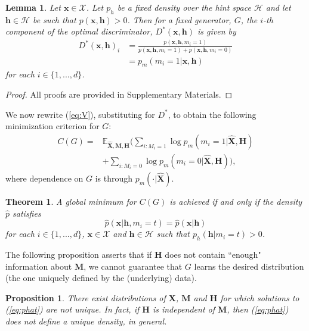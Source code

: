 \documentclass{article}
\newtheorem{theorem}{Theorem}
\newtheorem{proposition}{Proposition}
\newtheorem{lemma}{Lemma}
\begin{document}
\begin{lemma} \label{lem:D}
	Let $\mathbf{x} \in \mathcal{X}$. Let $p_h$ be a fixed density over the hint space $\mathcal{H}$ and let $\mathbf{h} \in \mathcal{H}$ be such that $p(\mathbf{x}, \mathbf{h}) > 0$.	Then for a fixed generator, $G$, the $i$-th component of the optimal discriminator, $D^*(\mathbf{x}, \mathbf{h})$ is given by
	\begin{align} \label{eq:optdis}
	D^*(\mathbf{x}, \mathbf{h})_i &= \frac{p(\mathbf{x}, \mathbf{h}, m_i = 1)}{p(\mathbf{x}, \mathbf{h}, m_i = 1) + p(\mathbf{x}, \mathbf{h}, m_i = 0)} \\
	&= p_m(m_i = 1 | \mathbf{x}, \mathbf{h})
	\end{align}
	for each $i \in \{1, ..., d\}$.
\end{lemma}
\begin{proof}
	All proofs are provided in Supplementary Materials.
\end{proof}

We now rewrite (\ref{eq:V}), substituting for $D^*$, to obtain the following minimization criterion for $G$:
\begin{align}
C(G) = &\mathbb{E}_{\hat{\mathbf{X}}, \mathbf{M}, \mathbf{H}}\Big(\underset{i: M_i = 1}{\sum}\log p_m(m_i = 1 | \hat{\mathbf{X}}, \mathbf{H})\\\nonumber
&+ \underset{i: M_i = 0}{\sum} \log p_m(m_i = 0 | \hat{\mathbf{X}}, \mathbf{H})\Big),
\end{align}
where dependence on $G$ is through $p_m(\cdot | \hat{\mathbf{X}})$.

\begin{theorem} \label{thm:main}
 	A global minimum for $C(G)$ is achieved if and only if the density $\hat{p}$ satisfies
	\begin{equation} \label{eq:phat}
	\hat{p}(\mathbf{x} | \mathbf{h}, m_i = t) = \hat{p}(\mathbf{x} | \mathbf{h})
	\end{equation}
	for each $i \in \{1, ..., d\}$, $\mathbf{x} \in \mathcal{X}$ and $\mathbf{h} \in \mathcal{H}$ such that $p_h(\mathbf{h} | m_i = t) > 0$.
\end{theorem}

The following proposition asserts that if $\mathbf{H}$ does not contain ``enough" information about $\mathbf{M}$, we cannot guarantee that $G$ learns the desired distribution (the one uniquely defined by the (underlying) data).

\begin{proposition} \label{prop:nonunique}
	There exist distributions of $\mathbf{X}$, $\mathbf{M}$ and $\mathbf{H}$ for which solutions to (\ref{eq:phat}) are not unique. In fact, if $\mathbf{H}$ is independent of $\mathbf{M}$, then (\ref{eq:phat}) does not define a unique density, in general.
\end{proposition}
\end{document}
